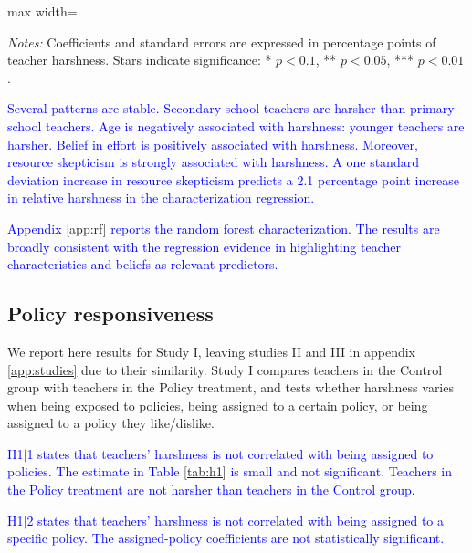 \documentclass[12pt,a4paper]{article}
\newcommand{\tabpath}{../3. Output/tables/}
\begin{document}
\begin{table}[H]
\centering
\caption{Teacher characteristics associated with harshness}
\label{tab:characterization}
\begin{adjustbox}{max width=\textwidth}

\end{adjustbox}
\begin{minipage}{0.92\textwidth}
\footnotesize \textit{Notes:} Coefficients and standard errors are expressed in percentage points of teacher harshness. Stars indicate significance: * \(p<0.1\), ** \(p<0.05\), *** \(p<0.01\).
\end{minipage}
\end{table}

\textcolor{blue}{Several patterns are stable. Secondary-school teachers are harsher than primary-school teachers. Age is negatively associated with harshness: younger teachers are harsher. Belief in effort is positively associated with harshness. Moreover, resource skepticism is strongly associated with harshness. A one standard deviation increase in resource skepticism predicts a 2.1 percentage point increase in relative harshness in the characterization regression.}

\textcolor{blue}{Appendix \ref{app:rf} reports the random forest characterization. The results are broadly consistent with the regression evidence in highlighting teacher characteristics and beliefs as relevant predictors.}

\subsection{Policy responsiveness}

We report here results for Study I, leaving studies II and III in appendix \ref{app:studies} due to their similarity. Study I compares teachers in the Control group with teachers in the Policy treatment, and tests whether harshness varies when being exposed to policies, being assigned to a certain policy, or being assigned to a policy they like/dislike.

\textcolor{blue}{H1\(|\)1 states that teachers' harshness is not correlated with being assigned to policies. The estimate in Table \ref{tab:h1} is small and not significant. Teachers in the Policy treatment are not harsher than teachers in the Control group.}

\textcolor{blue}{H1\(|\)2 states that teachers' harshness is not correlated with being assigned to a specific policy. The assigned-policy coefficients are not statistically significant.}
\end{document}
